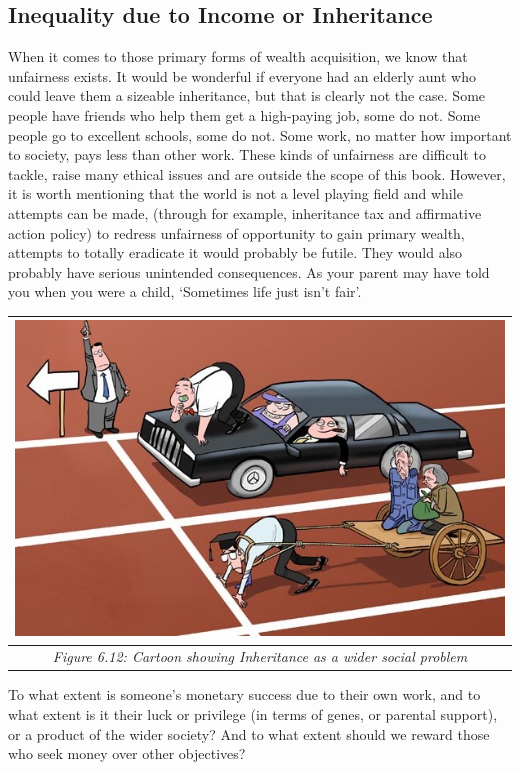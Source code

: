 \documentclass[]{tufte-handout}
\begin{document}
\hypertarget{inequality-due-to-income-or-inheritance}{%
\subsection{Inequality due to Income or
Inheritance}\label{inequality-due-to-income-or-inheritance}}

When it comes to those primary forms of wealth acquisition, we know that
unfairness exists. It would be wonderful if everyone had an elderly aunt
who could leave them a sizeable inheritance, but that is clearly not the
case. Some people have friends who help them get a high-paying job, some
do not. Some people go to excellent schools, some do not. Some work, no
matter how important to society, pays less than other work. These kinds
of unfairness are difficult to tackle, raise many ethical issues and are
outside the scope of this book. However, it is worth mentioning that the
world is not a level playing field and while attempts can be made,
(through for example, inheritance tax and affirmative action policy) to
redress unfairness of opportunity to gain primary wealth, attempts to
totally eradicate it would probably be futile. They would also probably
have serious unintended consequences. As your parent may have told you
when you were a child, `Sometimes life just isn't fair'.

\begin{longtable}[]{@{}c@{}}
\toprule
\includegraphics{ChapterPictures/6-11-InheritanceCartoon.jpg}\tabularnewline
\midrule
\endhead
\emph{Figure 6.12: Cartoon showing Inheritance as a wider social
problem}\tabularnewline
\bottomrule
\end{longtable}

To what extent is someone's monetary success due to their own work, and
to what extent is it their luck or privilege (in terms of genes, or
parental support), or a product of the wider society? And to what extent
should we reward those who seek money over other objectives?
\end{document}

